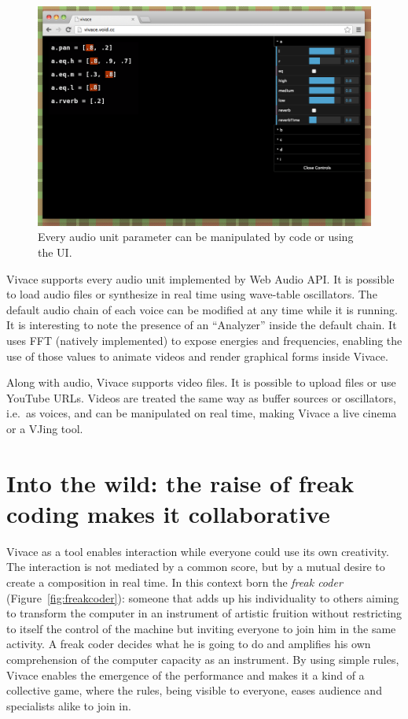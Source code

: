 \documentclass[letterpaper, 12pt]{article}
\begin{document}
\begin{figure}[htpb]
  \begin{center}
    \includegraphics[scale=.3]{img/fig_ui.png}
    \caption{Every audio unit parameter can be manipulated by code or
      using the UI.}
    \label{fig:ui}
  \end{center}
\end{figure}

Vivace supports every audio unit implemented by Web Audio API. It is
possible to load audio files or synthesize in real time using
wave-table oscillators. The default audio chain of each voice can be
modified at any time while it is running. It is interesting to note
the presence of an ``Analyzer'' inside the default chain. It uses FFT
(natively implemented) to expose energies and frequencies, enabling
the use of those values to animate videos and render graphical forms
inside Vivace.

Along with audio, Vivace supports video files. It is possible to
upload files or use YouTube URLs. Videos are treated the same way as
buffer sources or oscillators, i.e.\ as voices, and can be manipulated
on real time, making Vivace a live cinema or a VJing tool.

\section{Into the wild: the raise of freak coding makes it collaborative}

Vivace as a tool enables interaction while everyone could use its own
creativity. The interaction is not mediated by a common score, but by
a mutual desire to create a composition in real time. In this context
born the \emph{freak coder} (Figure~\ref{fig:freakcoder}): someone
that adds up his individuality to others aiming to transform the
computer in an instrument of artistic fruition without restricting to
itself the control of the machine but inviting everyone to join him in
the same activity. A freak coder decides what he is going to do and
amplifies his own comprehension of the computer capacity as an
instrument. By using simple rules, Vivace enables the emergence of the
performance and makes it a kind of a collective game, where the rules,
being visible to everyone, eases audience and specialists alike to
join in.
\end{document}
